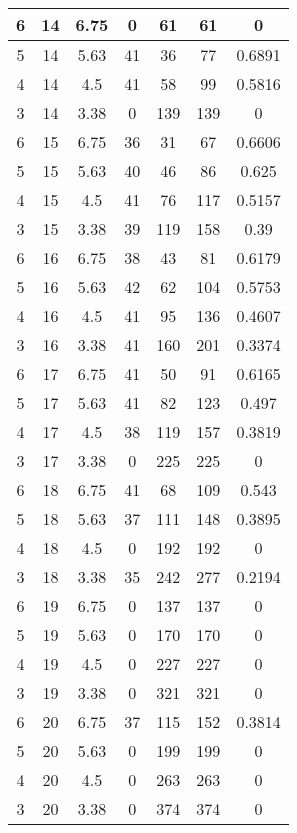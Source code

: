 \documentclass[letterpaper, 12pt]{article}
\begin{document}
\begin{longtable}{|c|c|c|c|c|c|c|}
\hline
6 & 14 & 6.75 & 0 & 61 & 61 & 0 \\
\hline
5 & 14 & 5.63 & 41 & 36 & 77 & 0.6891 \\
\hline
4 & 14 & 4.5 & 41 & 58 & 99 & 0.5816 \\
\hline
3 & 14 & 3.38 & 0 & 139 & 139 & 0 \\
\hline
6 & 15 & 6.75 & 36 & 31 & 67 & 0.6606 \\
\hline
5 & 15 & 5.63 & 40 & 46 & 86 & 0.625 \\
\hline
4 & 15 & 4.5 & 41 & 76 & 117 & 0.5157 \\
\hline
3 & 15 & 3.38 & 39 & 119 & 158 & 0.39 \\
\hline
6 & 16 & 6.75 & 38 & 43 & 81 & 0.6179 \\
\hline
5 & 16 & 5.63 & 42 & 62 & 104 & 0.5753 \\
\hline
4 & 16 & 4.5 & 41 & 95 & 136 & 0.4607 \\
\hline
3 & 16 & 3.38 & 41 & 160 & 201 & 0.3374 \\
\hline
6 & 17 & 6.75 & 41 & 50 & 91 & 0.6165 \\
\hline
5 & 17 & 5.63 & 41 & 82 & 123 & 0.497 \\
\hline
4 & 17 & 4.5 & 38 & 119 & 157 & 0.3819 \\
\hline
3 & 17 & 3.38 & 0 & 225 & 225 & 0 \\
\hline
6 & 18 & 6.75 & 41 & 68 & 109 & 0.543 \\
\hline
5 & 18 & 5.63 & 37 & 111 & 148 & 0.3895 \\
\hline
4 & 18 & 4.5 & 0 & 192 & 192 & 0 \\
\hline
3 & 18 & 3.38 & 35 & 242 & 277 & 0.2194 \\
\hline
6 & 19 & 6.75 & 0 & 137 & 137 & 0 \\
\hline
5 & 19 & 5.63 & 0 & 170 & 170 & 0 \\
\hline
4 & 19 & 4.5 & 0 & 227 & 227 & 0 \\
\hline
3 & 19 & 3.38 & 0 & 321 & 321 & 0 \\
\hline
6 & 20 & 6.75 & 37 & 115 & 152 & 0.3814 \\
\hline
5 & 20 & 5.63 & 0 & 199 & 199 & 0 \\
\hline
4 & 20 & 4.5 & 0 & 263 & 263 & 0 \\
\hline
3 & 20 & 3.38 & 0 & 374 & 374 & 0 \\
\hline
\end{longtable}
\end{document}
